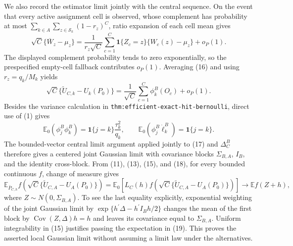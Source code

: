 We also record the estimator limit jointly with the central sequence.  On the event that every active assignment cell is observed, whose complement has probability at most \(\sum_{k\in A}\sum_{z\in\mathcal S_k}(1-r_z)^C\), ratio expansion of each cell mean gives
\[
\sqrt C\{\overline W_z-\mu_z\}
=\frac{1}{r_z\sqrt C}\sum_{c=1}^C
\mathbf1\{Z_c=z\}\{W_c(z)-\mu_z\}+o_P(1).
\tag{16}
\]
The displayed complement probability tends to zero exponentially, so the prespecified empty-cell fallback contributes \(o_P(1)\).  Averaging (16) and using \(r_z=q_k/M_k\) yields
\[
\sqrt C\{\widetilde U_{C,k}-U_k(P_0)\}
=\frac1{\sqrt C}\sum_{c=1}^C\phi_k^B(O_c)+o_P(1).
\tag{17}
\]
Besides the variance calculation in \texttt{thm:efficient-exact-hit-bernoulli}, direct use of (1) gives
\[
\mathbb E_0(\phi_j^B\phi_k^B)
=\mathbf1\{j=k\}\frac{\tau_k^2}{q_k},
\qquad
\mathbb E_0(\phi_j^B\dot\ell_k^B)=\mathbf1\{j=k\}.
\tag{18}
\]
The bounded-vector central limit argument applied jointly to (17) and \(\Delta_C^B\) therefore gives a centered joint Gaussian limit with covariance blocks \(\Sigma_{B,A}\), \(I_B\), and the identity cross-block.  From (11), (13), (15), and (18), for every bounded continuous \(f\), change of measure gives
\[
\mathbb E_{\bar P_{C,h}}f\!\left(\sqrt C\{\widetilde U_{C,A}-U_A(P_0)\}\right)
=\mathbb E_0\!\left[L_C(h)f\!\left(\sqrt C\{\widetilde U_{C,A}-U_A(P_0)\}\right)\right]
\longrightarrow
\mathbb E f(Z+h),
\tag{19}
\]
where \(Z\sim N(0,\Sigma_{B,A})\).  To see the last equality explicitly, exponential weighting of the joint Gaussian limit by \(\exp\{h^{\prime}\Delta-h^{\prime}I_Bh/2\}\) changes the mean of the first block by \(\operatorname{Cov}(Z,\Delta)h=h\) and leaves its covariance equal to \(\Sigma_{B,A}\).  Uniform integrability in (15) justifies passing the expectation in (19).  This proves the asserted local Gaussian limit without assuming a limit law under the alternatives.


